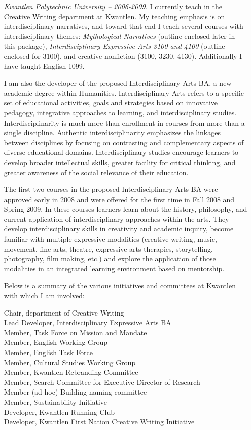 \documentclass[10pt,DIV09,letterpaper,oneside,headsepline]{scrreprt}
\begin{document}
\begin{itemize}

\item [\textit{Kwantlen Polytechnic University -- 2006-2009.}] I currently teach in the Creative Writing department at Kwantlen. My teaching emphasis is on interdisciplinary narratives, and toward that end I teach several courses with interdisciplinary themes: \textit{Mythological Narratives} (outline enclosed later in this package), \textit{Interdisciplinary Expressive Arts 3100 and 4100} (outline enclosed for 3100), and creative nonfiction (3100, 3230, 4130). Additionally I have taught English 1099.

I am also the developer of the proposed Interdisciplinary Arts BA, a new academic degree within Humanities. Interdisciplinary Arts refers to a specific set of educational activities, goals and strategies based on innovative pedagogy, integrative approaches to learning, and interdisciplinary studies. Interdisciplinarity is much more than enrollment in courses from more than a single discipline. Authentic interdisciplinarity emphasizes the linkages between disciplines by focusing on contrasting and complementary aspects of diverse educational domains. Interdisciplinary studies encourage learners to develop broader intellectual skills, greater facility for critical thinking, and greater awareness of the social relevance of their education.

The first two courses in the proposed Interdisciplinary Arts BA were approved early in 2008 and were offered for the first time in Fall 2008 and Spring 2009. In these courses learners learn about the history, philosophy, and current application of interdisciplinary approaches within the arts. They develop interdisciplinary skills in creativity and academic inquiry, become familiar with multiple expressive modalities (creative writing, music, movement, fine arts, theatre, expressive arts therapies, storytelling, photography, film making, etc.) and explore the application of those modalities in an integrated learning environment based on mentorship.

Below is a summary of the various initiatives and committees at Kwantlen with which I am involved:

Chair, department of Creative Writing\\
Lead Developer, Interdisciplinary Expressive Arts BA\\
Member, Task Force on Mission and Mandate\\
Member, English Working Group\\
Member, English Task Force\\
Member, Cultural Studies Working Group\\
Member, Kwantlen Rebranding Committee\\
Member, Search Committee for Executive Director of Research\\
Member (ad hoc) Building naming committee\\
Member, Sustainability Initiative\\
Developer, Kwantlen Running Club\\
Developer, Kwantlen First Nation Creative Writing Initiative


\end{itemize}
\end{document}
